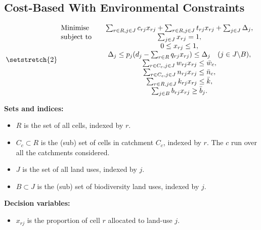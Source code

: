 \documentclass[12pt,a4paper,twoside]{article}
\begin{document}
\newpage

\subsection{Cost-Based With Environmental Constraints}\label{subsec:cbwevc}

\everymath{\displaystyle}
\begin{equation}
	{\setstretch{2}
	\begin{array}{l c}
	\text{Minimise} \quad & \sum_{r \in R, j \in J} c_{rj} x_{rj}
					+ \sum_{r \in R, j \in J} t_{rj} x_{rj}
					+ \sum_{j \in J} \Delta_j, \\

	\text{subject to} \quad
	& \sum_{j \in J} x_{rj}  = 1, \\
	& 0 \leq x_{rj} \leq 1, \\
	& \Delta_j \leq p_j (d_j - \sum_{r \in R} q_{rj} x_{rj}) \leq \Delta_j \quad (j \in J \backslash B), \\
	& \sum_{r \in C_c, j \in J} w_{rj} x_{rj} \leq \bar{w}_c, \\
	& \sum_{r \in C_c, j \in J} n_{rj} x_{rj} \leq \bar{n}_c, \\
	& \sum_{r \in R, j \in J} k_{rj} x_{rj} \leq \bar{k}, \\
	& \sum_{j \in B} b_{rj} x_{rj} \geq \bar{b}_j.

	\end{array}}
\end{equation}
\everymath{}

\textbf{Sets and indices:}
\begin{itemize}
	\item $R$ is the set of all cells, indexed by $r$.
	\item $C_c \subset R$ is the (sub) set of cells in catchment $C_c$, indexed by $r$. The $c$ run over all the catchments considered.
	\item $J$ is the set of all land uses, indexed by $j$.
	\item $B \subset J$ is the (sub) set of biodiversity land uses, indexed by $j$.
\end{itemize}

\textbf{Decision variables:}
\begin{itemize}
	\item $x_{rj}$ is the proportion of cell $r$ allocated to land-use $j$.
\end{itemize}
\end{document}

